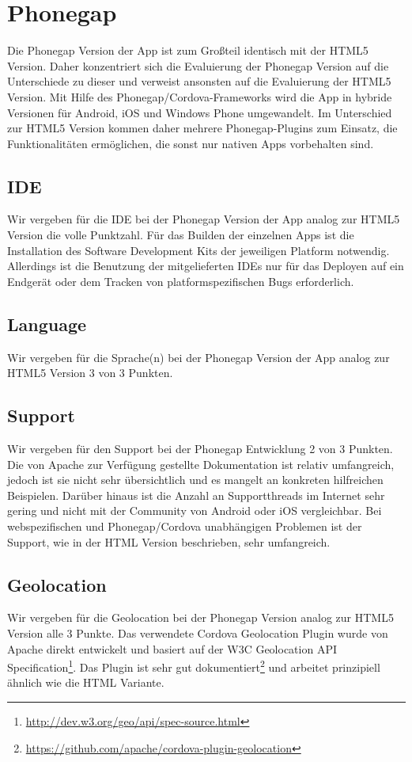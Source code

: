 \section{Phonegap}
Die Phonegap Version der App ist zum Großteil identisch mit der HTML5 Version. Daher konzentriert sich die Evaluierung der Phonegap Version auf die Unterschiede zu dieser und verweist ansonsten auf die Evaluierung der HTML5 Version. Mit Hilfe des Phonegap/Cordova-Frameworks wird die App in hybride Versionen für Android, iOS und Windows Phone umgewandelt. Im Unterschied zur HTML5 Version kommen daher mehrere Phonegap-Plugins zum Einsatz, die Funktionalitäten ermöglichen, die sonst nur nativen Apps vorbehalten sind.

\subsection{IDE}
Wir vergeben für die IDE bei der Phonegap Version der App analog zur HTML5 Version die volle Punktzahl. Für das Builden der einzelnen Apps ist die Installation des Software Development Kits der jeweiligen Platform notwendig. Allerdings ist die Benutzung der mitgelieferten IDEs nur für das Deployen auf ein Endgerät oder dem Tracken von platformspezifischen Bugs erforderlich.

\subsection{Language}
Wir vergeben für die Sprache(n) bei der Phonegap Version der App analog zur HTML5 Version 3 von 3 Punkten.

\subsection{Support}
Wir vergeben für den Support bei der Phonegap Entwicklung 2 von 3 Punkten. Die von Apache zur Verfügung gestellte Dokumentation ist relativ umfangreich, jedoch ist sie nicht sehr übersichtlich und es mangelt an konkreten hilfreichen Beispielen. Darüber hinaus ist die Anzahl an Supportthreads im Internet sehr gering und nicht mit der Community von Android oder iOS vergleichbar. Bei webspezifischen und Phonegap/Cordova unabhängigen Problemen ist der Support, wie in der HTML Version beschrieben, sehr umfangreich.

\subsection{Geolocation}
Wir vergeben für die Geolocation bei der Phonegap Version analog zur HTML5 Version alle 3 Punkte. Das verwendete Cordova Geolocation Plugin wurde von Apache direkt entwickelt und basiert auf der W3C Geolocation API Specification\footnote{\url{http://dev.w3.org/geo/api/spec-source.html}}. Das Plugin ist sehr gut dokumentiert\footnote{\url{https://github.com/apache/cordova-plugin-geolocation}} und arbeitet prinzipiell ähnlich wie die HTML Variante.

